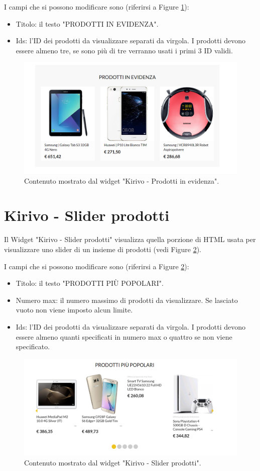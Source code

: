 I campi che si possono modificare sono (riferirsi a Figure \ref{fig:kevid}):
\begin{itemize}
\item Titolo: il testo "PRODOTTI IN EVIDENZA".
\item Ids: l'ID dei prodotti da visualizzare separati da virgola. I prodotti devono
essere almeno tre, se sono più di tre verranno usati i primi 3 ID validi.
\end{itemize}

\begin{figure}
  \includegraphics[width=\textwidth]{figure/kevid.png}
  \caption{Contenuto mostrato dal widget "Kirivo - Prodotti in evidenza".}
  \label{fig:kevid}
\end{figure}

\newpage
\section{Kirivo - Slider prodotti}


Il Widget "Kirivo - Slider prodotti"   visualizza quella porzione di HTML usata
per visualizzare uno slider di un insieme di prodotti (vedi Figure \ref{fig:kslide}).

I campi che si possono modificare sono (riferirsi a Figure \ref{fig:kslide}):
\begin{itemize}
\item Titolo: il testo "PRODOTTI PIÙ POPOLARI".
\item Numero max: il numero massimo di prodotti da visualizzare. Se lasciato vuoto non viene imposto alcun limite.
\item Ids: l'ID dei prodotti da visualizzare separati da virgola. I prodotti devono
essere almeno quanti specificati in numero max o quattro se non viene specificato.
\end{itemize}

\begin{figure}
  \includegraphics[width=\textwidth]{figure/kslide.png}
  \caption{Contenuto mostrato dal widget "Kirivo - Slider prodotti".}
  \label{fig:kslide}
\end{figure}

